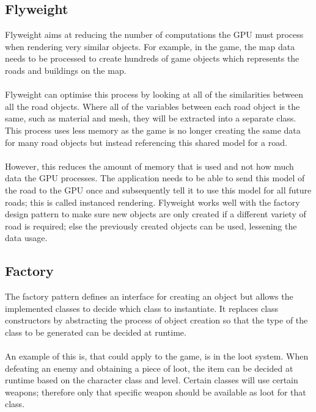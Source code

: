 \documentclass[a4paper]{report}
\begin{document}
\subsection{Flyweight}
Flyweight aims at reducing the number of computations the GPU must process when rendering very similar objects. For example, in the game, the map data needs to be processed to create hundreds of game objects which represents the roads and buildings on the map.
\\\\
Flyweight can optimise this process by looking at all of the similarities between all the road objects. Where all of the variables between each road object is the same, such as material and mesh, they will be extracted into a separate class. This process uses less memory as the game is no longer creating the same data for many road objects but instead referencing this shared model for a road.
\\\\
However, this reduces the amount of memory that is used and not how much data the GPU processes. The application needs to be able to send this model of the road to the GPU once and subsequently tell it to use this model for all future roads; this is called instanced rendering. Flyweight works well with the factory design pattern to make sure new objects are only created if a different variety of road is required; else the previously created objects can be used, lessening the data usage. \cite{GPP}

\subsection{Factory}
The factory pattern defines an interface for creating an object but allows the implemented classes to decide which class to instantiate. It replaces class constructors by abstracting the process of object creation so that the type of the class to be generated can be decided at runtime. \cite{GOF}
\\\\
An example of this is, that could apply to the game, is in the loot system. When defeating an enemy and obtaining a piece of loot, the item can be decided at runtime based on the character class and level. Certain classes will use certain weapons; therefore only that specific weapon should be available as loot for that class. \cite{Factory}
\end{document}
